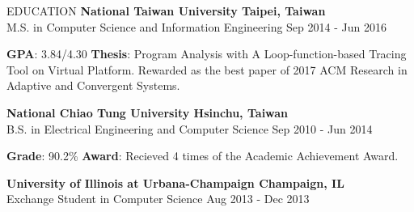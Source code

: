 \documentclass{resume} %
\begin{document}
\begin{rSection}{EDUCATION}
\textbf{National Taiwan University \hfill Taipei, Taiwan}
\\M.S. in Computer Science and Information Engineering \hfill Sep 2014 - Jun
2016%
\begin{outline}
  \1 \textbf{GPA}: 3.84/4.30
  \1 \textbf{Thesis}: Program Analysis with A Loop-function-based Tracing Tool
  on Virtual Platform.
    \2 Rewarded as the best paper of 2017 ACM Research in Adaptive and Convergent Systems.
\end{outline}

\textbf{National Chiao Tung University \hfill Hsinchu, Taiwan}
\\B.S. in Electrical Engineering and Computer Science \hfill Sep 2010 - Jun
2014%
\begin{outline}
  \1 \textbf{Grade}: 90.2\%
  \1 \textbf{Award}: Recieved 4 times of the Academic Achievement Award.
\end{outline}

\textbf{University of Illinois at Urbana-Champaign \hfill Champaign, IL}
\\Exchange Student in Computer Science \hfill Aug 2013 - Dec 2013%

\end{rSection}%

\end{document}
